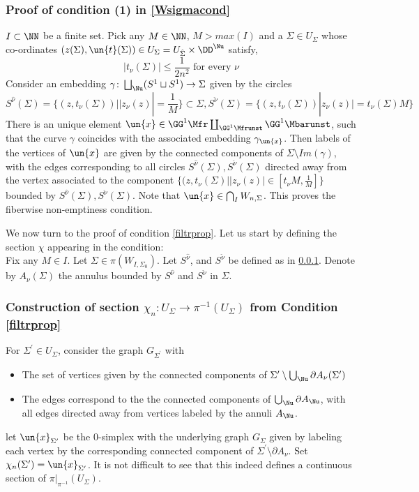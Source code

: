 \documentclass[a4paper,10pt]{amsart}
\begin{document}
\subsubsection{Proof of condition (1) in \ref{Wsigmacond}}\label{cond1}
$I \subset \NN$ be a finite set. Pick any $M \in \NN$, $M> max(I)$ and a $\Sigma \in U_{\Sigma}$ whose co-ordinates $(z(\Sigma),\un{t}(\Sigma)) \in  U_{\Sigma} = U_{\hat{\Sigma}} \times \DD^{\Nu}$ satisfy,
\[ |t_\nu(\Sigma)| \leq \frac{1}{2n^2} \mbox{ for every } \nu \]
Consider an embedding $\gamma \colon \bigsqcup_{\Nu} (S^1 \sqcup S^1) \to \Sigma$ given by the circles
\[ S^{\hat{\nu}}(\Sigma) = \{(z,t_{\nu}(\Sigma)) | |z_{\nu}(z)| = \frac{1}{M} \} \subset \Sigma, S^{\check{\nu}}(\Sigma) = \{(z,t_{\nu}(\Sigma))  |z_{\nu}(z)| = t_{\nu}(\Sigma)M \} \]
There is an unique element $\un{x} \in \GG^1 \Mfr \coprod_{\GG^1  \Mfrunst} \GG^1 \Mbarunst$, such that the curve $\gamma$ coincides with the associated embedding $\gamma_{\un{x}}$. Then labels of the vertices of $\un{x}$ are given by the connected components of $\Sigma \setminus Im(\gamma)$, with the edges corresponding to all circles $S^{\hat{\nu}}(\Sigma), S^{\check{\nu}}(\Sigma)$ directed away from the vertex associated to the component $\{(z,t_{\nu}(\Sigma) |  |z_\nu(z)| \in [t_\nu M , \frac{1}{M}] \}$ bounded by $S^{\hat{\nu}}(\Sigma), S^{\check{\nu}}(\Sigma)$. Note that $\un{x} \in \bigcap_{I}W_{n,\Sigma}$. This proves the fiberwise non-emptiness condition. 


We now turn to the proof of condition \ref{filtrprop}. Let us start by defining the section $\chi$ appearing in the condition:\\
Fix any $M \in I$. Let $\Sigma \in \pi(W_{I,\Sigma_0})$. Let $S^{\hat{\nu}}$, and $S^{\check{\nu}}$ be defined as in \ref{cond1}. Denote by $A_{\nu}(\Sigma)$ the annulus bounded by $S^{\hat{\nu}}$ and $S^{\check{\nu}}$ in $\Sigma$.


\subsubsection{Construction of section $\chi_n \colon U_{\Sigma} \to \pi^{-1}(U_{\Sigma})$ from Condition \ref{filtrprop}}
For $\Sigma^{\prime} \in U_{\Sigma}$, consider the graph $G_{\Sigma^{\prime}}$ with 
\begin{itemize}
	\item The set of vertices given by the connected components of $\Sigma^{\prime} \setminus \bigcup_{\Nu} \partial A_{\nu}(\Sigma^{\prime})$
	\item The edges correspond to the the connected components of $\bigcup_{\Nu} \partial A_{\Nu}$, with all edges directed away from vertices labeled by the annuli $A_{\Nu}$.
\end{itemize}
let $\un{x}_{\Sigma^{\prime}}$ be the $0$-simplex with the underlying graph $G_{\Sigma}$ given by labeling each vertex by the corresponding connected component of $\Sigma^{\prime} \setminus \partial A_{\nu}$. Set 
$\chi_n(\Sigma^{\prime}) = \un{x}_{\Sigma^{\prime}}$. It is not difficult to see that this indeed defines a continuous section of $\pi|_{\pi^{-1}}(U_{\Sigma})$.
\end{document}
